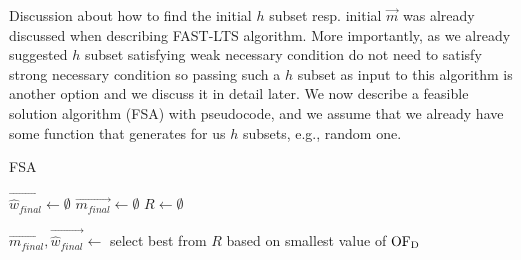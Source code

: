 Discussion about how to find the initial $h$ subset resp. initial $\vec{m}$ was already discussed when describing FAST-LTS algorithm.
More importantly, as we already suggested $h$ subset satisfying weak necessary condition do not need to satisfy strong necessary condition so passing such a $h$ subset as input to this algorithm is another option and we discuss it in detail later. We now describe a feasible solution algorithm (FSA) with pseudocode, and we assume that we already have some function that generates for us $h$ subsets, e.g., random one. 

\newcommand\mycommfont[1]{\footnotesize\ttfamily\textcolor{blue}{#1}}

\begin{algorithm}[H]
    \label{alg:feasible_solution}
        
    \caption{FSA}
    $\vec{\hat{w}_{final}} \gets \emptyset$\;
    $\vec{m_{final}} \gets \emptyset$\;
    $R \gets \emptyset$\;

    $\vec{m_{final}}, \vec{\hat{w}_{final}}  \gets $ select best from $R$ based on smallest value of $\operatorname{OF_D}$\;
    \;
\end{algorithm}




